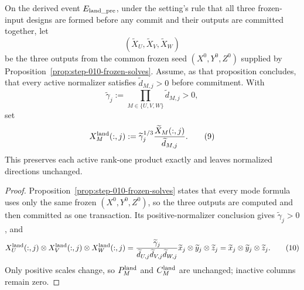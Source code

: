 \begin{proposition}\label{prop:step-010-rebalance}
On the derived event \(E_{\rm land\_pre}\), under
the setting's rule that all three frozen-input designs are formed before any
commit and their outputs are committed together, let
\[
(\widetilde X_U,\widetilde X_V,\widetilde X_W)
\]
be the three outputs from the common frozen seed
\((X^0,Y^0,Z^0)\) supplied by
Proposition~\ref{prop:step-010-frozen-solves}.  Assume, as that proposition
concludes, that every active normalizer satisfies
\(\widetilde d_{M,j}>0\) before commitment.  With
\[
\widetilde\gamma_j:=\prod_{M\in\{U,V,W\}}\widetilde d_{M,j}>0,
\]
set
\[
X_M^{\rm land}(:,j):=\widetilde\gamma_j^{1/3}
\frac{\widetilde X_M(:,j)}{\widetilde d_{M,j}}. \tag{9}
\]
This preserves each active rank-one product exactly and leaves normalized
directions unchanged.

\begin{proof}
Proposition~\ref{prop:step-010-frozen-solves}
states that every mode formula uses only the same frozen
\((X^0,Y^0,Z^0)\), so the three outputs are computed and then committed as
one transaction.  Its positive-normalizer conclusion gives
\(\widetilde\gamma_j>0\), and
\[
X_U^{\rm land}(:,j)\otimes X_V^{\rm land}(:,j)\otimes X_W^{\rm land}(:,j)
=\frac{\widetilde\gamma_j}
{\widetilde d_{U,j}\widetilde d_{V,j}\widetilde d_{W,j}}
\widetilde x_j\otimes\widetilde y_j\otimes\widetilde z_j
=\widetilde x_j\otimes\widetilde y_j\otimes\widetilde z_j. \tag{10}
\]
Only positive scales change, so \(P_M^{\rm land}\) and \(C_M^{\rm land}\)
are unchanged; inactive columns remain zero.


\end{proof}
\end{proposition}
